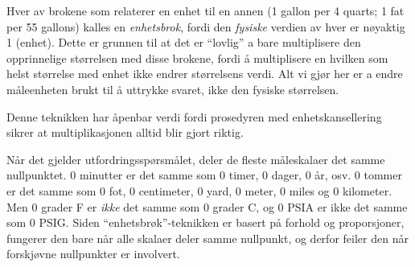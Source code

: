 





Hver av brokene som relaterer en enhet til en annen (1 gallon per 4 quarts; 1 fat per 55 gallons) kalles en {\it enhetsbrok}, fordi den {\it fysiske} verdien av hver er nøyaktig 1 (enhet).  Dette er grunnen til at det er ``lovlig'' a bare multiplisere den opprinnelige størrelsen med disse brokene, fordi å multiplisere en hvilken som helst størrelse med enhet ikke endrer størrelsens verdi.  Alt vi gjør her er a endre måleenheten brukt til å uttrykke svaret, ikke den fysiske størrelsen.

Denne teknikken har åpenbar verdi fordi prosedyren med enhetskansellering sikrer at multiplikasjonen alltid blir gjort riktig.

\vskip 10pt

Når det gjelder utfordringsspørsmålet, deler de fleste måleskalaer det samme nullpunktet.  0 minutter er det samme som 0 timer, 0 dager, 0 år, osv.  0 tommer er det samme som 0 fot, 0 centimeter, 0 yard, 0 meter, 0 miles og 0 kilometer.  Men 0 grader F er {\it ikke} det samme som 0 grader C, og 0 PSIA er ikke det samme som 0 PSIG.  Siden ``enhetsbrøk''-teknikken er basert på forhold og proporsjoner, fungerer den bare når alle skalaer deler samme nullpunkt, og derfor feiler den når forskjøvne nullpunkter er involvert.




